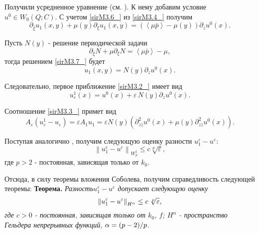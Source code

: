 Получили усредненное уравнение (см. \cite{Sirazh3}). К нему добавим условие $u^{0} \in W_{0} (Q;C)$. С учетом \eqref{sirM3.6_} из \eqref{sirM3.4_} получим
\begin{equation}
\partial _{\bar{\xi }} u_{1} (x,y)+\mu (y)\partial _{\xi } u_{1} (x,y)=\left(\left\langle \mu \bar{p}\right\rangle -\mu (y)\right)\partial _{z} u^{0} (x).
\label{sirM3.7_}
\end{equation}

Пусть  $N(y)$ - решение периодической задачи
\begin{equation*}
\partial _{\bar{\xi }} N+\mu \partial _{\xi } N=\left\langle \mu \bar{p}\right\rangle -\mu ,
\end{equation*}
тогда решением \eqref{sirM3.7_} будет
\begin{equation*}
u_{1} (x,y)=N(y)\partial _{z} u^{0} (x).
\end{equation*}

Следовательно, первое приближение \eqref{sirM3.2_} имеет вид
\begin{equation*}
u_{\varepsilon }^{1} (x)=u^{0} (x)+\varepsilon \, N(y)\partial _{z} u^{0} (x).
\end{equation*}

Соотношение \eqref{sirM3.3_} примет вид
\begin{equation}
A_{\varepsilon } (u_{\varepsilon }^{1} -u_{\varepsilon } )=\varepsilon A_{1} u_{1} =\varepsilon N(y)\left(\partial _{z\bar{z}}^{2} u^{0} (x)+\mu (y)\partial _{zz}^{2} u^{0} (x)\right).
\label{sirM3.8_}
\end{equation}

Поступая аналогично  \cite{JikovKozlov}, получим следующую оценку разности  $u_{1}^{\varepsilon } -u^{\varepsilon } $:
\begin{equation*}
\left\| u_{1}^{\varepsilon } -u^{\varepsilon } \right\| _{W_{p}^{1} } \le c\sqrt[{P}]{\varepsilon },
\end{equation*}
где $p>2$ - постоянная, зависящая только от $k_{0}$.

Отсюда,  в силу теоремы вложения Соболева, получим справедливость следующей теоремы:
\textbf{Теорема.  }\textit{Разность}\textit{$u_{1}^{\varepsilon } -u^{\varepsilon } $ допускает следующую оценку}
\begin{equation*}
\left\| u_{1}^{\varepsilon } -u^{\varepsilon } \right\| _{H^{\alpha } } \le c{\kern 1pt} \, \sqrt[{p}]{\varepsilon },
\end{equation*}
\textit{где  $c>0$ - постоянная, зависящая только от $k_{0} $, $f$; $H^{\alpha } $ - пространство Гельдера непрерывных функций,  $\alpha ={(p-2) \mathord{\left/{\vphantom{(p-2) p}}\right.\kern-\nulldelimiterspace} p} $.}

